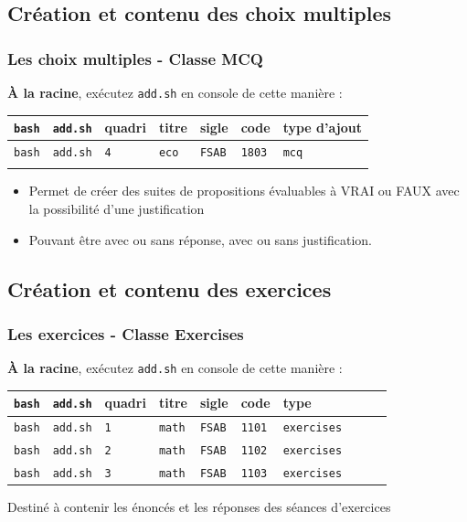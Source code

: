\documentclass{beamer}
\begin{document}
\subsection{Création et contenu des choix multiples}

\begin{frame}
    \frametitle{Les choix multiples - Classe MCQ}
    \begin{exampleblock}{\textbf{À la racine}, exécutez \lstinline|add.sh| en
    console de cette manière :}
       \begin{tabular}{lllllll}
           \lstinline|bash| & \lstinline|add.sh| & quadri & titre & sigle & code & type d'ajout
           \\ \hline
           \lstinline|bash| & \lstinline|add.sh| & \lstinline|4| & \lstinline|eco| & \lstinline|FSAB| & \lstinline|1803| & \lstinline|mcq| \\\\
       \end{tabular}
    \end{exampleblock}
    \begin{itemize}
        \item Permet de créer des suites de propositions évaluables à
            VRAI ou FAUX avec la possibilité d'une justification
        \item Pouvant être avec ou sans réponse, avec ou sans
            justification.
    \end{itemize}
\end{frame}


\subsection{Création et contenu des exercices}

\begin{frame}
    \frametitle{Les exercices - Classe Exercises}
    \begin{exampleblock}{\textbf{À la racine}, exécutez \lstinline|add.sh| en
    console de cette manière :}
       \begin{tabular}{llllllllll}
           \lstinline|bash| & \lstinline|add.sh| & quadri & titre & sigle & code & type \\
           \hline
	   \lstinline|bash| & \lstinline|add.sh| & \lstinline|1| & \lstinline|math| & \lstinline|FSAB| & \lstinline|1101| & \lstinline|exercises| \\
	   \lstinline|bash| & \lstinline|add.sh| & \lstinline|2| & \lstinline|math| & \lstinline|FSAB| & \lstinline|1102| & \lstinline|exercises| \\
	   \lstinline|bash| & \lstinline|add.sh| & \lstinline|3| & \lstinline|math| & \lstinline|FSAB| & \lstinline|1103| & \lstinline|exercises| \\
       \end{tabular}
   \end{exampleblock}
   Destiné à contenir les énoncés et les réponses des séances d'exercices

\end{frame}
\end{document}
